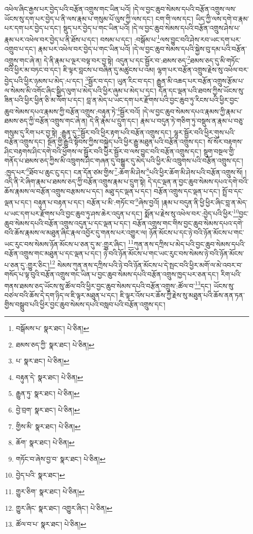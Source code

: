 འཕེལ་ཞིང་རྒྱས་པར་བྱེད་པའི་བརྩོན་འགྲུས་གང་ཡིན་པའོ། །དེ་ལ་བྱང་ཆུབ་སེམས་དཔའི་བརྩོན་འགྲུས་ལས་ཡོངས་སུ་དག་པར་བྱེད་པ་ནི་ལས་རྣམ་པ་གསུམ་པོ་ལུས་ཀྱི་ལས་དང་། ངག་གི་ལས་དང་། ཡིད་ཀྱི་ལས་དགེ་བ་རྣམ་པར་དག་པར་བྱེད་པ་དང་། སྡུད་པར་བྱེད་པ་གང་ཡིན་པའོ། །དེ་ལ་བྱང་ཆུབ་སེམས་དཔའི་བརྩོན་འགྲུས་ཤེས་པ་རྣམ་པར་འཕེལ་བར་བྱེད་པ་ནི་ཐོས་པ་དང་། བསམ་པ་དང་། :བསྒོམ་པ་\footnote{བསྒོམས་པ་  སྣར་ཐང་།  པེ་ཅིན། }ལས་བྱུང་བའི་ཤེས་རབ་ཡང་དག་པར་འགྲུབ་པ་དང་། རྣམ་པར་འཕེལ་བར་བྱེད་པ་གང་ཡིན་པའོ། །དེ་ལ་བྱང་ཆུབ་སེམས་དཔའི་སྐྱེས་བུ་དམ་པའི་བརྩོན་འགྲུས་གང་ཞེ་ན། དེ་ནི་རྣམ་པ་ལྔར་བལྟ་བར་བྱ་སྟེ། འདུན་པ་དང་སྦྱོར་བ་:ཐམས་ཅད་\footnote{ཐམས་ཅད་ཀྱི་  སྣར་ཐང་།  པེ་ཅིན། }ཐམས་ཅད་དུ་མི་གཏོང་བའི་ཕྱིར་མ་བཏང་བ་དང་། ཇི་ལྟར་བླངས་པ་བཞིན་དུ་མཚུངས་པ་འམ། ལྷག་པར་བརྩོན་འགྲུས་རྗེས་སུ་འཕེལ་བར་བྱེད་པའི་ཕྱིར་ཉམས་པ་མེད་:པ་དང་། \footnote{པ་  སྣར་ཐང་།  པེ་ཅིན། }སྦྱོར་བ་དང་། ཡུན་རིང་བ་དང་། རྒྱུན་མི་འཆད་པར་བརྩོན་འགྲུས་རྩོམ་པ་ལ་སེམས་མི་འགོང་ཞིང་སྒྱིད་ལུག་པ་མེད་པའི་ཕྱིར་ཞུམ་པ་མེད་པ་དང་། དོན་དང་ལྡན་པའི་ཐབས་ཀྱིས་ཡོངས་སུ་ཟིན་པའི་ཕྱིར་ཕྱིན་ཅི་མ་ལོག་པ་དང་། བླ་ན་མེད་པ་ཡང་དག་པར་རྫོགས་པའི་བྱང་ཆུབ་ཏུ་རིངས་པའི་ཕྱིར་བྱང་ཆུབ་སེམས་དཔའ་རྣམས་ཀྱི་བརྩོན་འགྲུས་:བརྟུན་ཏེ་\footnote{བརྟུན་དེ་  སྣར་ཐང་།  པེ་ཅིན། }སྦྱོར་བའོ། །དེ་ལ་བྱང་ཆུབ་སེམས་དཔའ་རྣམས་ཀྱི་རྣམ་པ་ཐམས་ཅད་ཀྱི་བརྩོན་འགྲུས་གང་ཞེ་ན། དེ་ནི་རྣམ་པ་དྲུག་དང་། རྣམ་པ་བདུན་ཏེ་གཅིག་ཏུ་བསྡུས་ན་རྣམ་པ་བཅུ་གསུམ་དུ་རིག་པར་བྱ་སྟེ། :རྒྱུན་དུ་\footnote{རྒྱུན་ཏུ་  སྣར་ཐང་།  པེ་ཅིན། }སྦྱོར་བའི་ཕྱིར་རྟག་པའི་བརྩོན་འགྲུས་དང་། ལྷུར་སྦྱོར་བའི་ཕྱིར་གུས་པའི་བརྩོན་འགྲུས་དང་། སྔོན་གྱི་རྒྱུའི་སྟོབས་ཀྱིས་བསྐྱེད་པའི་ཕྱིར་རྒྱུ་མཐུན་པའི་བརྩོན་འགྲུས་དང་། སོ་སོར་བརྟགས་ཤིང་བརྟགས་ཤིང་དགེ་བའི་ཕྱོགས་ལ་སྦྱོར་བའི་ཕྱིར་སྦྱོར་བ་ལས་བྱུང་བའི་བརྩོན་འགྲུས་དང་། སྡུག་བསྔལ་གྱི་གནོད་པ་ཐམས་ཅད་ཀྱིས་མི་འཁྲུགས་ཤིང་གཞན་དུ་བསྒྱུར་དུ་མེད་པའི་ཕྱིར་མི་འཁྲུགས་པའི་བརྩོན་འགྲུས་དང་། :ཁྱད་པར་\footnote{བྱེ་བྲག་  སྣར་ཐང་།  པེ་ཅིན། }ཐོབ་པ་ཆུང་ངུ་དང་། ངན་དོན་ཙམ་གྱིས་\footnote{གྱིས་མི་  སྣར་ཐང་།  པེ་ཅིན། }:ཆོག་མི་ཤེས་\footnote{ཆོག་  སྣར་ཐང་།  པེ་ཅིན། }པའི་ཕྱིར་ཆོག་མི་ཤེས་པའི་བརྩོན་འགྲུས་སོ། །འདི་ནི་རེ་ཞིག་རྣམ་པ་ཐམས་ཅད་ཀྱི་བརྩོན་འགྲུས་རྣམ་པ་དྲུག་སྟེ། དེ་དང་ལྡན་ན་བྱང་ཆུབ་སེམས་དཔའ་དགེ་བའི་ཆོས་རྣམས་ལ་བརྩོན་འགྲུས་བརྩམས་པ་དང་། མཐུ་དང་ལྡན་པ་དང་། བརྩོན་འགྲུས་དང་ལྡན་པ་དང་། སྤྲོ་བ་དང་ལྡན་པ་དང་། བརྟུན་པ་བརྟན་པ་དང་། བརྩོན་པ་མི་:གཏོང་བ་\footnote{གཏོང་བ་ཞེས་བྱ་བ་  སྣར་ཐང་།  པེ་ཅིན། }ཞེས་བྱའོ། །རྣམ་པ་བདུན་ནི་ཕྱི་ཕྱིར་ཞིང་བླ་ན་མེད་པ་ཡང་དག་པར་རྫོགས་པའི་བྱང་ཆུབ་ཏུ་ཤས་ཆེར་འདུན་པ་དང་། སྨོན་པ་རྗེས་སུ་འཕེལ་བར་:བྱེད་པའི་ཕྱིར་\footnote{བྱེད་པའི་  སྣར་ཐང་། }བྱང་ཆུབ་སེམས་དཔའི་བརྩོན་འགྲུས་འདུན་པ་དང་ལྡན་པ་དང་། བརྩོན་འགྲུས་གང་གིས་བྱང་ཆུབ་སེམས་དཔའ་དགེ་བའི་ཆོས་རྣམས་ལ་མཐུན་ཞིང་རྣལ་འབྱོར་དུ་གནས་པར་འགྱུར་ལ། ཉོན་མོངས་པ་དང་ཉེ་བའི་ཉོན་མོངས་པ་གང་ཡང་རུང་བས་སེམས་ཉོན་མོངས་པ་ཅན་དུ་མ་:གྱུར་ཞིང་། \footnote{གྱུར་ཅིག་  སྣར་ཐང་།  པེ་ཅིན། }ཀུན་ནས་དཀྲིས་པ་མེད་པའི་བྱང་ཆུབ་སེམས་དཔའི་བརྩོན་འགྲུས་གང་མཐུན་པ་དང་ལྡན་པ་དང་། ཉེ་བའི་ཉོན་མོངས་པ་གང་ཡང་རུང་བས་སེམས་ཉེ་བའི་ཉོན་མོངས་པ་ཅན་དུ་:གྱུར་ཅིང་།\footnote{གྱུར་ཞིང་  སྣར་ཐང་། འགྱུར་ཞིང་།  པེ་ཅིན། } སེམས་ཀུན་ནས་དཀྲིས་པའི་ཉེ་བའི་ཉོན་མོངས་པ་དེ་སྤང་བའི་ཕྱིར་མགོ་ལ་མེ་འབར་བ་གསོད་པ་ལྟ་བུའི་བརྩོན་འགྲུས་གང་ཡིན་པ་བྱང་ཆུབ་སེམས་དཔའི་བརྩོན་འགྲུས་ཁྱད་པར་ཅན་དང་། རིག་པའི་གནས་ཐམས་ཅད་ཡོངས་སུ་ཚོལ་བའི་ཕྱིར་བྱང་ཆུབ་སེམས་དཔའི་བརྩོན་འགྲུས་:ཚོལ་བ་\footnote{ཚོལ་བ་པ་  སྣར་ཐང་།  པེ་ཅིན། }དང་། ཡོངས་སུ་བཙལ་བའི་ཆོས་དེ་དག་ཉིད་ལ་ཇི་ལྟར་མཐུན་པ་དང་། ཇི་ལྟར་འོས་པར་ཆོས་ཀྱི་རྗེས་སུ་མཐུན་པའི་ཆོས་ནན་ཏན་གྱིས་བསྒྲུབ་པའི་ཕྱིར་བྱང་ཆུབ་སེམས་དཔའི་བསླབ་པའི་བརྩོན་འགྲུས་དང་། 